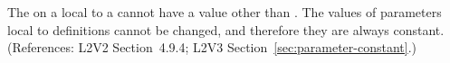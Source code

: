 The   on a \Parameter local to a \KineticLaw cannot
have a value other than .  The values of parameters local to
\KineticLaw definitions cannot be changed, and therefore they are always
constant.  (References: L2V2 Section~4.9.4; L2V3
Section~\ref{sec:parameter-constant}.)
